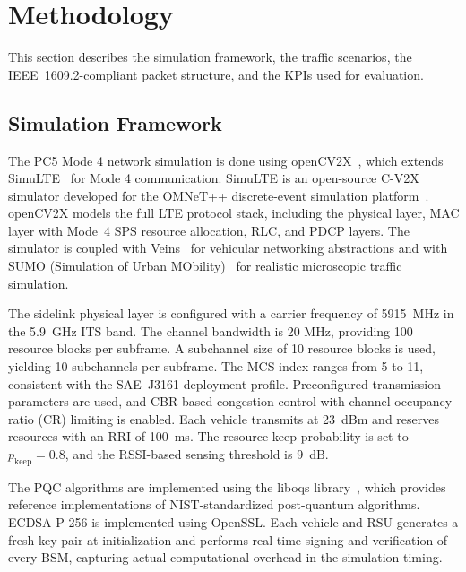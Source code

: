 \documentclass[letterpaper,journal]{IEEEtran}
\begin{document}
\section{Methodology}
\label{sec:method}

This section describes the simulation framework, the traffic scenarios, the IEEE~1609.2-compliant packet structure, and the KPIs used for evaluation.

\subsection{Simulation Framework}
\label{sec:sim_framework}

The PC5 Mode 4 network simulation is done using openCV2X~\cite{opencv2x}, which extends SimuLTE~\cite{virdis2014simulte} for Mode 4 communication. SimuLTE is an open-source C-V2X simulator developed for the OMNeT++ discrete-event simulation platform~\cite{varga2019omnetpp}. openCV2X models the full LTE protocol stack, including the physical layer, MAC layer with Mode~4 SPS resource allocation, RLC, and PDCP layers. The simulator is coupled with Veins~\cite{sommer2019veins} for vehicular networking abstractions and with SUMO (Simulation of Urban MObility)~\cite{lopez2018sumo} for realistic microscopic traffic simulation.

The sidelink physical layer is configured with a carrier frequency of 5915~MHz in the 5.9~GHz ITS band. The channel bandwidth is 20 MHz, providing 100 resource blocks per subframe. A subchannel size of 10 resource blocks is used, yielding 10 subchannels per subframe. The MCS index ranges from 5 to 11, consistent with the SAE~J3161 deployment profile. Preconfigured transmission parameters are used, and CBR-based congestion control with channel occupancy ratio (CR) limiting is enabled. Each vehicle transmits at 23~dBm and reserves resources with an RRI of 100~ms. The resource keep probability is set to $p_\text{keep} = 0.8$, and the RSSI-based sensing threshold is 9~dB.

The PQC algorithms are implemented using the liboqs library~\cite{stebila2020liboqs}, which provides reference implementations of NIST-standardized post-quantum algorithms. ECDSA P-256 is implemented using OpenSSL. Each vehicle and RSU generates a fresh key pair at initialization and performs real-time signing and verification of every BSM, capturing actual computational overhead in the simulation timing.
\end{document}
